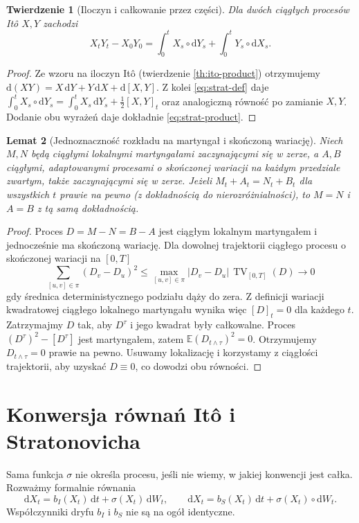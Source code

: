 \documentclass[11pt,a4paper,oneside]{report}
\numberwithin{equation}{chapter}
\theoremstyle{plain}
\newtheorem{twierdzenie}{Twierdzenie}[chapter]
\newtheorem{lemat}[twierdzenie]{Lemat}
\theoremstyle{definition}
\theoremstyle{remark}
\newcommand{\E}{\mathbb{E}}
\newcommand{\dd}{\mathrm{d}}
\begin{document}
\begin{twierdzenie}[Iloczyn i całkowanie przez części]\label{thm:volIII:04:03}
Dla dwóch ciągłych procesów Itô $X,Y$ zachodzi
\[
X_tY_t-X_0Y_0
=\int_0^tX_s\circ\dd Y_s+
\int_0^tY_s\circ\dd X_s.
\tag{4.7}\label{eq:strat-product}
\]
\end{twierdzenie}
\begin{proof}
Ze wzoru na iloczyn Itô (twierdzenie
\ref{th:ito-product}) otrzymujemy
$\dd(XY)=X\,\dd Y+Y\,\dd X+\dd[X,Y]$.
Z kolei \eqref{eq:strat-def} daje
$\int_0^t X_s\circ\dd Y_s=\int_0^t X_s\,\dd Y_s+\frac12[X,Y]_t$
oraz analogiczną równość po zamianie $X,Y$.
Dodanie obu wyrażeń daje dokładnie
\eqref{eq:strat-product}.
\end{proof}

\begin{lemat}[Jednoznaczność rozkładu na martyngał i skończoną wariację]\label{lem:volIII:04:01}
\label{lem:uniqueness-mart-fv}
Niech $M,N$ będą ciągłymi lokalnymi martyngałami zaczynającymi się
w zerze, a $A,B$ ciągłymi, adaptowanymi procesami o skończonej
wariacji na każdym przedziale zwartym, także zaczynającymi się
w zerze. Jeżeli $M_t+A_t=N_t+B_t$ dla wszystkich $t$ prawie
na pewno (z dokładnością do nierozróżnialności), to $M=N$ i
$A=B$ z tą samą dokładnością.
\end{lemat}
\begin{proof}
Proces $D=M-N=B-A$ jest ciągłym lokalnym martyngałem
i jednocześnie ma skończoną wariację. Dla dowolnej
trajektorii ciągłego procesu o skończonej wariacji na $[0,T]$
\[
\sum_{[u,v]\in\pi}(D_v-D_u)^2
\le\max_{[u,v]\in\pi}|D_v-D_u|\,\operatorname{TV}_{[0,T]}(D)
\longrightarrow0
\]
gdy średnica deterministycznego podziału dąży do zera.
Z definicji wariacji kwadratowej ciągłego lokalnego
martyngału wynika więc $[D]_t=0$ dla każdego $t$.
Zatrzymajmy $D$ tak, aby $D^\tau$ i jego kwadrat były
całkowalne. Proces $(D^\tau)^2-[D^\tau]$
jest martyngałem, zatem
$\E(D_{t\wedge\tau})^2=0$.
Otrzymujemy $D_{t\wedge\tau}=0$ prawie na pewno.
Usuwamy lokalizację i korzystamy z ciągłości trajektorii,
aby uzyskać $D\equiv0$, co dowodzi obu równości.
\end{proof}

\section{Konwersja równań Itô i Stratonovicha}\label{sec:volIII:04:04}
Sama funkcja $\sigma$ nie określa procesu, jeśli nie
wiemy, w jakiej konwencji jest całka. Rozważmy
formalnie równania
\[
\dd X_t=b_I(X_t)\,\dd t+\sigma(X_t)\,\dd W_t,
\qquad
\dd X_t=b_S(X_t)\,\dd t+\sigma(X_t)\circ\dd W_t.
\]
Współczynniki dryfu $b_I$ i $b_S$ nie są na ogół
identyczne.
\end{document}
